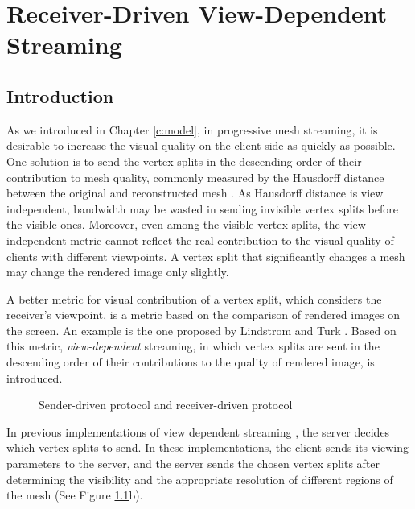 \chapter{Receiver-Driven View-Dependent Streaming}
\label{c:rdstream}
\section{Introduction}
\label{s:dstream:intro}
    As we introduced in Chapter \ref{c:model}, 
    in progressive mesh streaming, it is desirable to increase the visual quality
    on the client side as quickly as possible.
    One solution is to send the vertex splits
    in the descending order of their contribution to
    mesh quality, commonly measured by the Hausdorff distance between
    the original and reconstructed mesh \cite{cignoni98metro}.
    As Hausdorff distance is view independent, 
    bandwidth may be wasted in sending invisible vertex splits
    before the visible ones. Moreover, even among the visible vertex splits,
    the view-independent metric cannot 
    reflect the real contribution to the visual quality of
    clients with different viewpoints. A vertex split that significantly
    changes a mesh may change the rendered image 
    only slightly.

    A better metric for visual contribution of a vertex split, 
    which considers the receiver's viewpoint, is 
    a metric based on the comparison of rendered images on the screen.
    An example is the one proposed by Lindstrom and Turk \cite{353995}.
    Based on this metric, \emph{view-dependent} streaming,
    in which vertex splits are sent in the descending order of 
    their contributions to the quality of rendered image, is introduced. 
    
    \begin{figure}
    \centering
    \caption{Sender-driven protocol and receiver-driven protocol 
    \label{dstream:protocol}}
    \end{figure}
    In previous implementations of view dependent streaming
    \cite{To1999, 363375, progressive:Yang, kim:view, zheng:interactive}, 
    the server decides which vertex splits to send. In these implementations,  
    the client sends its
    viewing parameters to the server, and the server sends the chosen vertex splits after
    determining the visibility and the appropriate resolution of 
    different regions of the mesh (See Figure \ref{dstream:protocol}b).
    
